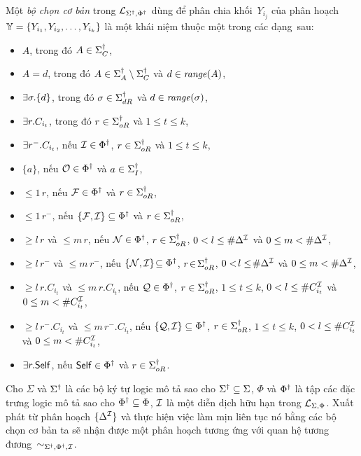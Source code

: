 \begin{Definition}
	\label{def:BasicSelectors}
	Một {\em bộ chọn cơ bản} trong $\mathcal{L}_{\Sigma^\dag,\Phi^\dag}$ dùng để phân chia khối~$Y_{i_j}$ của phân hoạch $\mathbb{Y} = \{Y_{i_1}, Y_{i_2}, \ldots, Y_{i_k}\}$ là một khái niệm thuộc một trong các dạng~sau:
	\begin{itemize}
		\item $A$, trong đó $A \in \Sigma^\dag_C$,
%		
		\item $A=d$, trong đó $A \in \Sigma^\dag_A\setminus\Sigma^\dag_C$ và $d \in \mathit{range}(A)$,
%		
		\item $\exists \sigma.\{d\}$, trong đó $\sigma \in \Sigma^\dag_{dR}$ và $d \in \mathit{range}(\sigma)$,
%
		\item $\exists r.C_{i_t}$, trong đó $r \in \Sigma^\dag_{oR}$ và $1 \leq t \leq k$,
%		
		\item $\exists r^-.C_{i_t}$, nếu $\mathcal{I} \in \Phi^\dag$, $r \in \Sigma^\dag_{oR}$ và $1 \leq t \leq k$,
%
		\item $\{a\}$, nếu $\mathcal{O} \in \Phi^\dag$ và $a \in \Sigma^\dag_I$,
%		
		\item $\leq\!1\,r$, nếu $\mathcal{F} \in \Phi^\dag$ và $r \in \Sigma^\dag_{oR}$,
%		
		\item $\leq\!1\,r^-$, nếu $\{\mathcal{F}, \mathcal{I}\} \subseteq \Phi^\dag$ và $r \in \Sigma^\dag_{oR}$,
%
		\item $\geq\!l\,r$ và $\leq\!m\,r$, nếu $\mathcal{N} \in \Phi^\dag$, $r \in \Sigma^\dag_{oR}$, $0 < l \leq \#\Delta^{\mathcal{I}}$ và $0 \leq m < \#\Delta^{\mathcal{I}}$,
%
		\item $\geq\!l\,r^-$ và $\leq\!m\,r^-$, nếu $\{\mathcal{N}, \mathcal{I}\}\!\subseteq \Phi^\dag$, $r\!\in\!\Sigma^\dag_{oR}$, $0 <\!l \leq\! \#\Delta^{\mathcal{I}}$ và $0 \leq m < \#\Delta^{\mathcal{I}}$,
%
		\item $\geq\!l\,r.C_{i_t}$ và $\leq\!m\,r.C_{i_t}$, nếu $\mathcal{Q} \in \Phi^\dag$, $r \in \Sigma^\dag_{oR}$, $1 \leq t \leq k$, $0 < l \leq \#C_{i_t}^{\mathcal{I}}$ và $0 \leq m < \#C_{i_t}^{\mathcal{I}}$,
%
		\item $\geq\!l\,r^-.C_{i_t}$ và $\leq\!m\,r^-.C_{i_t}$, nếu $\{\mathcal{Q}, \mathcal{I}\} \subseteq \Phi^\dag$, $r \in \Sigma^\dag_{oR}$, $1 \leq t \leq k$, $0 < l \leq \#C_{i_t}^{\mathcal{I}}$ và $0 \leq m < \#C_{i_t}^{\mathcal{I}}$,
%
		\item $\exists r.\mathsf{Self}$, nếu $\mathsf{Self} \in \Phi^\dag$ và $r \in \Sigma^\dag_{oR}$.\myend
	\end{itemize}
\end{Definition}

\begin{Theorem}
\label{th:BasicSelectors}
	Cho $\Sigma$ và $\Sigma^\dag$ là các bộ ký tự logic mô tả sao cho $\Sigma^\dag \subseteq \Sigma$, $\Phi$ và $\Phi^\dag$ là tập các đặc trưng logic mô tả sao cho $\Phi^\dag \subseteq \Phi$, $\mathcal{I}$ là một diễn dịch hữu hạn trong $\mathcal{L}_{\Sigma,\Phi}$.
	Xuất phát từ phân hoạch $\{\Delta^{\mathcal{I}}\}$ và thực hiện việc làm mịn liên tục nó bằng các bộ chọn cơ bản ta sẽ nhận được một phân hoạch tương ứng với quan hệ tương đương~$\sim_{\Sigma^\dag,\Phi^\dag,\mathcal{I}}$.\myend
\end{Theorem}

